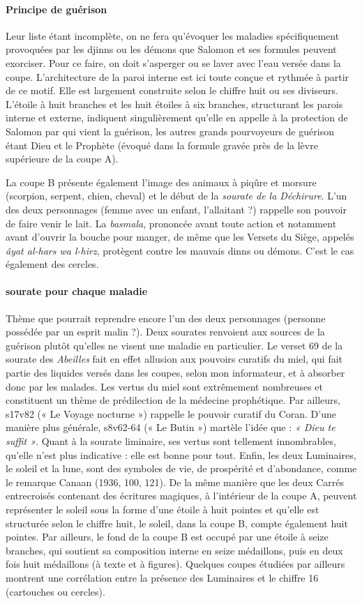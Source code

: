 \paragraph{Principe de guérison}
Leur liste étant incomplète, on ne fera qu'évoquer les maladies spécifiquement provoquées par les djinns ou les démons que Salomon et ses formules peuvent exorciser. Pour ce faire, on doit s'asperger ou se laver avec l'eau versée dans la coupe. L'architecture de la paroi interne est ici toute conçue et rythmée à partir de ce motif. Elle est largement construite selon le chiffre huit ou ses diviseurs. L'étoile à huit branches et les huit étoiles à six branches, structurant les parois interne et externe, indiquent singulièrement qu'elle en appelle à la protection de Salomon par qui vient la guérison, les autres grands pourvoyeurs de guérison étant Dieu et le Prophète (évoqué dans la formule gravée près de la lèvre supérieure de la coupe A).


La coupe B présente également l'image des animaux à piqûre et morsure (scorpion, serpent, chien, cheval) et le début de la \textit{sourate de la Déchirure}. L'un des deux personnages (femme avec un enfant, l'allaitant ?) rappelle son pouvoir de faire venir le lait. La \textit{basmala}, prononcée avant toute action et notamment avant d'ouvrir la bouche pour manger, de même que les Versets du Siège, appelés \textit{âyat al-hars wa l-hirz}, protègent contre les mauvais dinns ou démons. C'est le cas également des cercles.

\paragraph{sourate pour chaque maladie}
Thème que pourrait reprendre encore l'un des deux personnages (personne possédée par un esprit malin ?). Deux sourates renvoient aux sources de la guérison plutôt qu'elles ne visent une maladie en particulier. Le verset 69 de la sourate des \textit{Abeilles} fait en effet allusion aux pouvoirs curatifs du miel, qui fait partie des liquides versés dans les coupes, selon mon informateur, et à absorber donc par les malades. Les vertus du miel sont extrêmement nombreuses et constituent un thème de prédilection de la médecine prophétique. Par ailleurs, s17v82 (« Le Voyage nocturne ») rappelle le pouvoir curatif du Coran. D'une manière plus générale, s8v62-64 (« Le Butin ») martèle l'idée que : \textit{« Dieu te suffit »}. Quant à la sourate liminaire, ses vertus sont tellement innombrables, qu'elle n'est plus indicative : elle est bonne pour tout. Enfin, les deux Luminaires, le soleil et la lune, sont des symboles de vie, de prospérité et d'abondance, comme le remarque Canaan (1936, 100, 121). De la même manière que les deux Carrés entrecroisés contenant des écritures magiques, à l'intérieur de la
 coupe A, peuvent représenter le soleil sous la forme d'une étoile à huit pointes et qu'elle est structurée selon le chiffre huit, le soleil, dans la coupe B, compte également huit pointes. Par ailleurs, le fond de la coupe B est occupé par une étoile à seize branches, qui soutient sa composition interne en seize médaillons, puis en deux fois huit médaillons (à texte et à figures). Quelques coupes étudiées par ailleurs montrent une corrélation entre la présence des Luminaires et le chiffre 16 (cartouches ou cercles).
